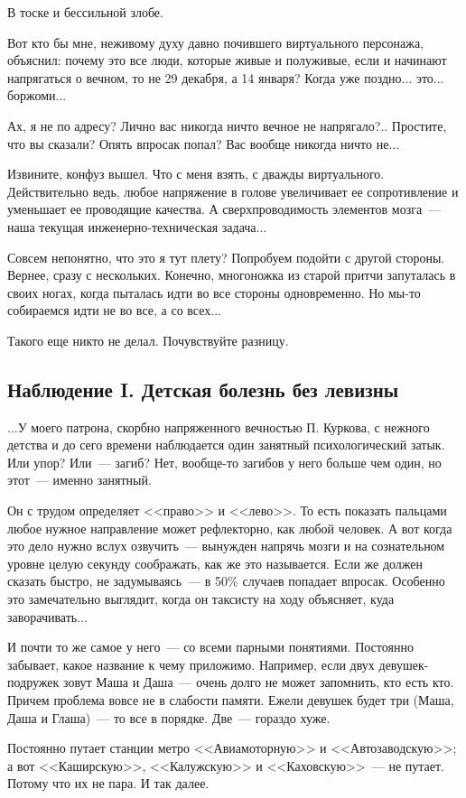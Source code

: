 \documentclass{scrbook}
\newcommand{\flqq}{<<}
\newcommand{\frqq}{>>}
\newcommand{\mdash}{~--- }
\newcommand{\essaysection}[1]{\subsection*{#1}\nopagebreak}
\begin{document}
В тоске и бессильной злобе.

Вот кто бы мне, неживому духу давно почившего виртуального персонажа, объяснил: почему это все люди, которые живые и полуживые, если и начинают напрягаться о вечном, то не 29 декабря, а 14 января? Когда уже поздно... это... боржоми...

Ах, я не по адресу? Лично вас никогда ничто вечное не напрягало?.. Простите, что вы сказали? Опять впросак попал? Вас вообще никогда ничто не...

Извините, конфуз вышел. Что с меня взять, с дважды виртуального. Действительно ведь, любое напряжение в голове увеличивает ее сопротивление и уменьшает ее проводящие качества. А сверхпроводимость элементов мозга{\mdash}наша текущая инженерно-техническая задача...

Совсем непонятно, что это я тут плету? Попробуем подойти с другой стороны. Вернее, сразу с нескольких. Конечно, многоножка из старой притчи запуталась в своих ногах, когда пыталась идти во все стороны одновременно. Но мы-то собираемся идти не во все, а со всех...

Такого еще никто не делал. Почувствуйте разницу.

\essaysection{Наблюдение I. Детская болезнь без левизны}

...У моего патрона, скорбно напряженного вечностью П. Куркова, с нежного детства и до сего времени наблюдается один занятный психологический затык. Или упор? Или{\mdash}загиб? Нет, вообще-то загибов у него больше чем один, но этот{\mdash}именно занятный.

Он с трудом определяет {\flqq}право{\frqq} и {\flqq}лево{\frqq}. То есть показать пальцами любое нужное направление может рефлекторно, как любой человек. А вот когда это дело нужно вслух озвучить{\mdash}вынужден напрячь мозги и на сознательном уровне целую секунду соображать, как же это называется. Если же должен сказать быстро, не задумываясь{\mdash}в 50\% случаев попадает впросак. Особенно это замечательно выглядит, когда он таксисту на ходу объясняет, куда заворачивать...

И почти то же самое у него{\mdash}со всеми парными понятиями. Постоянно забывает, какое название к чему приложимо. Например, если двух девушек-подружек зовут Маша и Даша{\mdash}очень долго не может запомнить, кто есть кто. Причем проблема вовсе не в слабости памяти. Ежели девушек будет три (Маша, Даша и Глаша){\mdash}то все в порядке. Две{\mdash}гораздо хуже.

Постоянно путает станции метро {\flqq}Авиамоторную{\frqq} и {\flqq}Автозаводскую{\frqq}; а вот {\flqq}Каширскую{\frqq}, {\flqq}Калужскую{\frqq} и {\flqq}Каховскую{\frqq}{\mdash}не путает. Потому что их не пара. И так далее.
\end{document}

